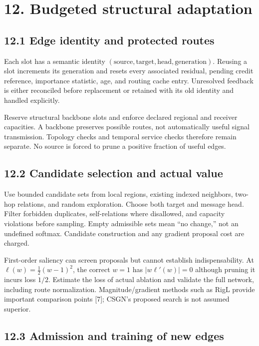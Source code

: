 \documentclass[
  11pt,
  a4paper,
]{article}
\begin{document}
\section{12. Budgeted structural
adaptation}\label{budgeted-structural-adaptation}

\subsection{12.1 Edge identity and protected
routes}\label{edge-identity-and-protected-routes}

Each slot has a semantic identity
\((\text{source},\text{target},\text{head},\text{generation})\). Reusing
a slot increments its generation and resets every associated residual,
pending credit reference, importance statistic, age, and routing cache
entry. Unresolved feedback is either reconciled before replacement or
retained with its old identity and handled explicitly.

Reserve structural backbone slots and enforce declared regional and
receiver capacities. A backbone preserves possible routes, not
automatically useful signal transmission. Topology checks and temporal
service checks therefore remain separate. No source is forced to prune a
positive fraction of useful edges.

\subsection{12.2 Candidate selection and actual
value}\label{candidate-selection-and-actual-value}

Use bounded candidate sets from local regions, existing indexed
neighbors, two-hop relations, and random exploration. Choose both target
and message head. Filter forbidden duplicates, self-relations where
disallowed, and capacity violations before sampling. Empty admissible
sets mean ``no change,'' not an undefined softmax. Candidate
construction and any gradient proposal cost are charged.

First-order saliency can screen proposals but cannot establish
indispensability. At \(\ell(w)=\tfrac12(w-1)^2\), the correct \(w=1\)
has \(|w\ell'(w)|=0\) although pruning it incurs loss \(1/2\). Estimate
the loss of actual ablation and validate the full network, including
route normalization. Magnitude/gradient methods such as RigL provide
important comparison points {[}7{]}; CSGN's proposed search is not
assumed superior.

\subsection{12.3 Admission and training of new
edges}\label{admission-and-training-of-new-edges}
\end{document}
